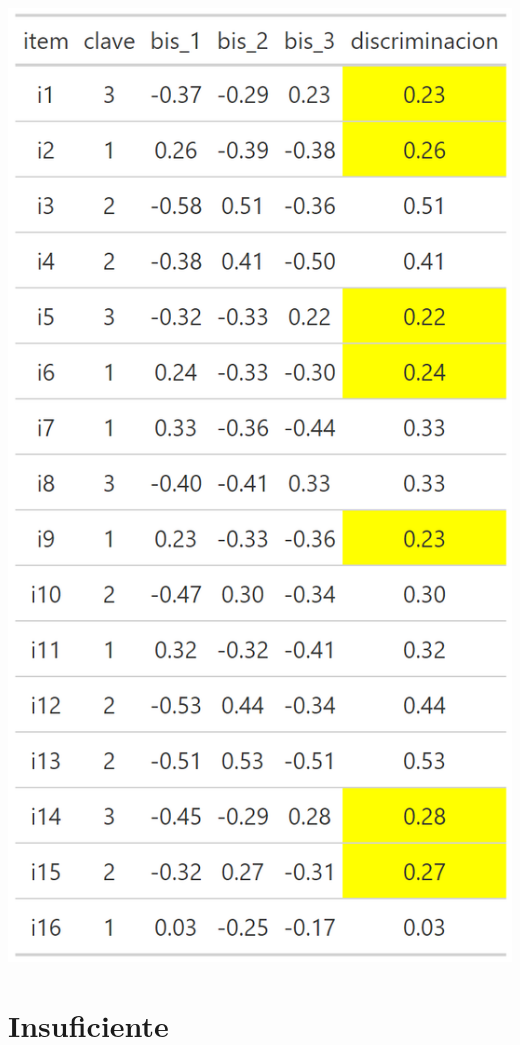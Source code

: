 \documentclass[
  letterpaper,
  DIV=11,
  numbers=noendperiod]{scrreprt}
\begin{document}
\begin{center}
\includegraphics[width=0.6\linewidth,height=\textheight,keepaspectratio]{images/teoria_clasica_disc_medio.png}
\end{center}

\section{Insuficiente}
\end{document}
